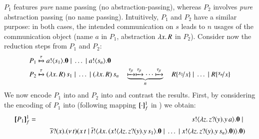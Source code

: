\documentclass[preprint,11pt]{elsarticle}
\begin{document}
{%
 $P_1$ features \emph{pure} name passing (no abstraction-passing), whereas 
$P_2$ involves \emph{pure} abstraction passing (no name passing). Intuitively, 
$P_1$ and $P_2$ have a similar purpose:
in both cases, 
the intended communication on $s$ leads to $n$ usages of the communication object (name $a$ in $P_1$, abstraction $\lambda x.\,R$ in $P_2$).
Consider now the reduction steps from $P_1$ and $P_2$:
\begin{align*}
P_1  \hby{\tau} ~& \bout{a}{s_1} \inact \Par \dots \Par \bout{a}{s_n} \inact \\
P_2  \hby{\tau}~& \appl{(\abs{x}{R})}{s_1} \Par \dots \Par \appl{(\abs{x}{R})}{s_n} \quad 
\underbrace{\hby{\btau}\hby{\btau} \cdots \hby{\btau}}_{n} 
\quad R \subst{s_1}{x} \Par \dots \Par R \subst{s_n}{x} 
\end{align*}
We now encode $P_1$ into \HO and $P_2$ into \sessp and contrast the results. 
First, by considering the encoding of $P_1$ into \HO  (following mapping $[\!\![\cdot]\!\!]^1_f$ in )
we obtain:
\begin{eqnarray*}
\map{P_1}^{1}_f & = &  	\bout{s}{\abs{z}{\binp{z}{y} \appl{y}{a}}} \inact \Par \\
& & \quad  \binp{\dual{s}}{x} \newsp{t}{\appl{x}{t} \Par \bout{\dual{t}}{\abs{x}{(\bout{x}{\abs{z}{\binp{z}{y} \appl{y}{s_1}}} \inact \Par \dots \Par \bout{x}{\abs{z}{\binp{z}{y} \appl{y}{s_n}}} \inact)}} \inact}\\

\end{eqnarray*}}
\end{document}
